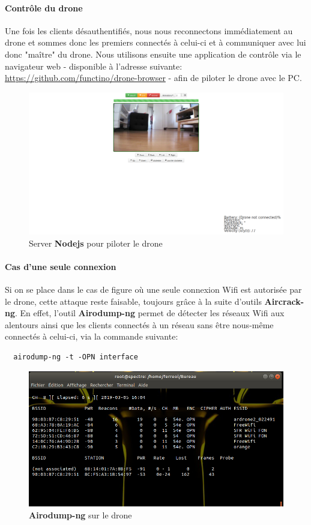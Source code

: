\paragraph{Contrôle du drone}
Une fois les clients désauthentifiés, nous nous reconnectons immédiatement au drone et sommes donc les premiers connectés à celui-ci et à communiquer avec lui donc "maître" du drone. Nous utilisons ensuite une application de contrôle via le navigateur web \cite{ref5} - disponible à l'adresse suivante: \url{https://github.com/functino/drone-browser} - afin de piloter le drone avec le PC.

\begin{figure}[H]
  \centering
  \includegraphics[scale=0.3]{images/drone_browser}
  \caption{Server \textbf{Nodejs} pour piloter le drone}
\end{figure}

\paragraph{Cas d'une seule connexion}
Si on se place dans le cas de figure où une seule connexion Wifi est autorisée par le drone, cette attaque reste faisable, toujours grâce à la suite d'outils \textbf{Aircrack-ng}. En effet, l'outil \textbf{Airodump-ng} permet de détecter les réseaux Wifi aux alentours ainsi que les clients connectés à un réseau sans être nous-même connectés à celui-ci, via la commande suivante:
\begin{verbatim}
  airodump-ng -t -OPN interface
\end{verbatim}

\begin{figure}[H]
  \centering
  \includegraphics[scale=0.5]{images/airodump}
  \caption{\textbf{Airodump-ng} sur le drone}
\end{figure}

